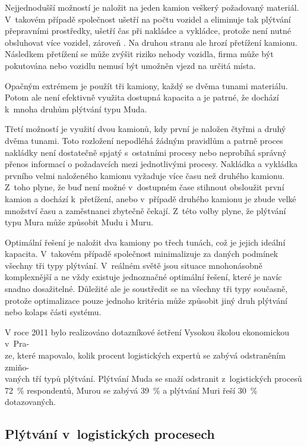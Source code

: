 Nejjednodušší možností je naložit na jeden kamion veškerý požadovaný materiál. V~takovém případě společnost ušetří na počtu vozidel a eliminuje tak plýtvání přepravními prostředky, ušetří čas při nakládce a vykládce, protože není nutné obsluhovat více vozidel, zároveň . Na druhou stranu ale hrozí přetížení kamionu. Následkem přetížení se může zvýšit riziko nehody vozidla, firma může být pokutována nebo vozidlu nemusí být umožněn vjezd na určitá místa.

Opačným extrémem je použít tři kamiony, každý se dvěma tunami materiálu. Potom ale není efektivně využita dostupná kapacita a je patrné, že dochází k~mnoha druhům plýtvání typu Muda.

Třetí možností je využití dvou kamionů, kdy první je naložen čtyřmi a druhý dvěma tunami. Toto rozložení nepodléhá žádným pravidlům a patrně proces nakládky není dostatečně spjatý s~ostatními procesy nebo neprobíhá správný přenos informací o požadavcích mezi jednotlivými procesy. Nakládka a vykládka prvního velmi naloženého kamionu vyžaduje více času než druhého kamionu. Z~toho plyne, že buď není možné v~dostupném čase stihnout obsloužit první kamion a dochází k~přetížení, anebo v~případě druhého kamionu je zbude velké množství času a zaměstnanci zbytečně čekají. Z~této volby plyne, že plýtvání typu Mura může způsobit Mudu i Muru.\cite{bib:LW3}

Optimální řešení je naložit dva kamiony po třech tunách, což je jejich ideální kapacita. V~takovém případě společnost minimalizuje za daných podmínek všechny tři typy plýtvání. V~reálném světě jsou situace mnohonásobně komplexnější a ne vždy existuje jednoznačné optimální řešení, které je navíc snadno dosažitelné. Důležité ale je soustředit se na všechny tři typy současně, protože optimalizace pouze jednoho kritéria může způsobit jiný druh plýtvání nebo kolaps části systému. 

V roce 2011 bylo realizováno dotazníkové šetření Vysokou školou ekonomickou v~Pra-\\ze, které mapovalo, kolik procent logistických expertů se zabývá odstraněním zmiňo-\\vaných tří typů plýtvání. Plýtvání Muda se snaží odstranit z~logistických procesů 72~\% respondentů, Murou se zabývá 39~\% a plýtvání Muri řeší 30~\% dotazovaných.\cite{bib:Jirsak}

\subsection{Plýtvání v~logistických procesech}

